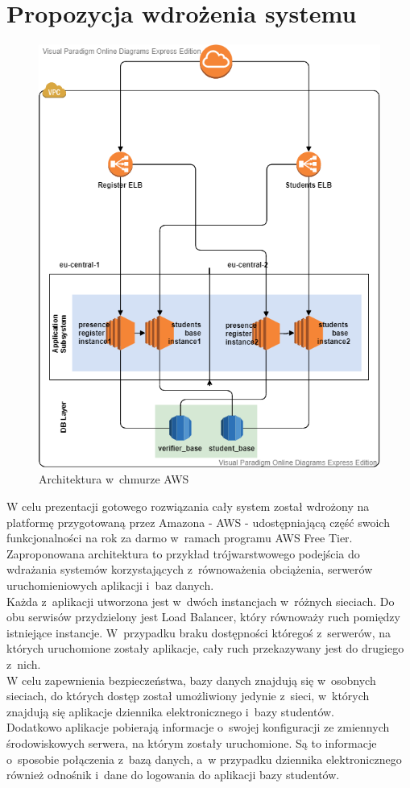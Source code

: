 \documentclass[declaration,shortabstract, mgr]{iithesis}
\begin{document}
\section{Propozycja wdrożenia systemu}
\begin{figure}[h]
\caption{Architektura w~chmurze AWS}
\centering
\includegraphics[scale=0.6]{AWS.png}
\end{figure}
\indent W celu prezentacji gotowego rozwiązania cały system został wdrożony na platformę przygotowaną przez Amazona - AWS\cite{aws} - udostępniającą część swoich funkcjonalności na rok za darmo w~ramach programu AWS Free Tier. \\
\indent Zaproponowana architektura to przykład trójwarstwowego podejścia do wdrażania systemów korzystających z~równoważenia obciążenia, serwerów uruchomieniowych aplikacji i~baz danych. \\
\indent Każda z~aplikacji utworzona jest w~dwóch instancjach w~różnych sieciach. Do obu serwisów przydzielony jest Load Balancer, który równoważy ruch pomiędzy istniejące instancje. W~przypadku braku dostępności któregoś z~serwerów, na których uruchomione zostały aplikacje, cały ruch przekazywany jest do drugiego z~nich.\\
\indent W celu zapewnienia bezpieczeństwa, bazy danych znajdują się w~osobnych sieciach, do których dostęp został umożliwiony jedynie z~sieci, w~których znajdują się aplikacje dziennika elektronicznego i~bazy studentów. \\
\indent Dodatkowo aplikacje pobierają informacje o~swojej konfiguracji ze zmiennych środowiskowych serwera, na którym zostały uruchomione. Są to informacje o~sposobie połączenia z~bazą danych, a~w przypadku dziennika elektronicznego również odnośnik i~dane do logowania do aplikacji bazy studentów.
\end{document}
